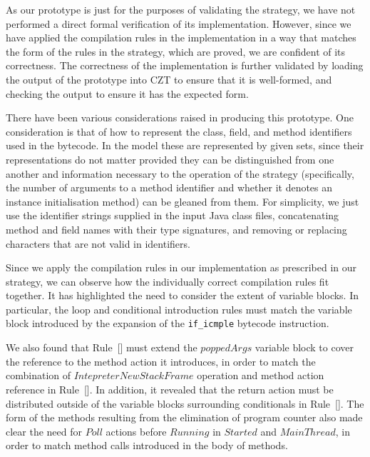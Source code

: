 As our prototype is just for the purposes of validating the strategy,
we have not performed a direct formal verification of its
implementation.
However, since we have applied the compilation rules in the
implementation in a way that matches the form of the rules in the
strategy, which are proved, we are confident of its correctness.
The correctness of the implementation is further validated by loading
the output of the prototype into CZT to ensure that it is well-formed,
and checking the output to ensure it has the expected form.

There have been various considerations raised in producing this
prototype. 
One consideration is that of how to represent the class, field,
and method identifiers used in the bytecode.
In the model these are represented by given sets, since their
representations do not matter provided they can be distinguished from
one another and information necessary to the operation of the strategy
(specifically, the number of arguments to a method identifier and
whether it denotes an instance initialisation method) can be gleaned
from them.
For simplicity, we just use the identifier strings supplied in the
input Java class files, concatenating method and field names with
their type signatures, and removing or replacing characters that are
not valid in \Circus{} identifiers.

Since we apply the compilation rules in our implementation as
prescribed in our strategy, we can observe how the individually
correct compilation rules fit together.
It has highlighted the need to consider the extent of
variable blocks.
In particular, the loop and conditional introduction rules must match
the variable block introduced by the expansion of the
\texttt{if\_icmple} bytecode instruction. 

We also found that Rule~[] must
extend the $poppedArgs$ variable block to cover the reference to the
method action it introduces, in order to match the combination of
$IntepreterNewStackFrame$ operation and method action reference in
Rule~[].
In addition, it revealed that the return action must be distributed
outside of the variable blocks surrounding conditionals in
Rule~[].
The form of the methods resulting from the elimination of program
counter also made clear the need for $Poll$ actions before $Running$
in $Started$ and $MainThread$, in order to match method calls
introduced in the body of methods.

